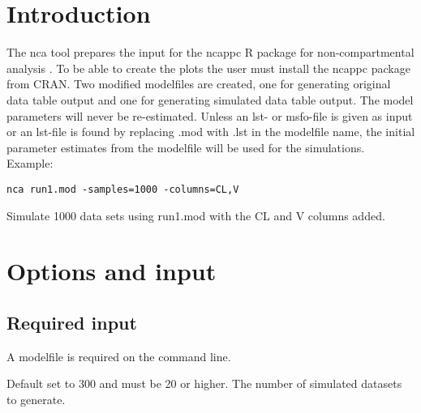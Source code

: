 

\newcommand{\guidetoolname}{nca}



\maketitle

\section{Introduction}
The nca tool prepares the input for the ncappc R package for non-compartmental analysis \cite{Chayan}. To be able to create the plots the user must install the ncappc package from CRAN. Two modified modelfiles are created, one for generating original data table output and one for generating simulated data table output. The model parameters will never be re-estimated. Unless an lst- or msfo-file is given as input or an lst-file is found by replacing .mod with .lst in the modelfile name, the initial parameter estimates from the modelfile will be used for the simulations.\\
Example:
\begin{verbatim}
nca run1.mod -samples=1000 -columns=CL,V
\end{verbatim}
Simulate 1000 data sets using run1.mod with the CL and V columns added.

\section{Options and input}

\subsection{Required input}
A modelfile is required on the command line.
\begin{optionlist}
Default set to 300 and must be 20 or higher. The number of simulated datasets to generate. 
\nextopt
\end{optionlist}

